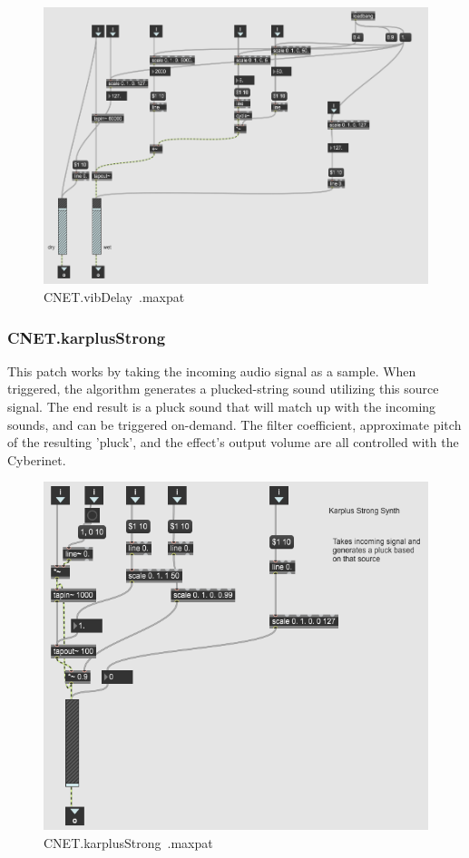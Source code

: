 \begin{figure}
    \centering
    \includegraphics[scale=0.8]{diagrams/maxPatches/CNET.vibDelay~.png}
    \caption{CNET.vibDelay~.maxpat}
    \label{fig:vibDel}
\end{figure}

\subsubsection{CNET.karplusStrong~}
This patch works by taking the incoming audio signal as a sample. When triggered, the algorithm generates a plucked-string sound utilizing this source signal. The end result is a pluck sound that will match up with the incoming sounds, and can be triggered on-demand. The filter coefficient, approximate pitch of the resulting 'pluck', and the effect's output volume are all controlled with the Cyberinet.

\begin{figure}
    \centering
    \includegraphics{diagrams/maxPatches/CNET.kStrong.png}
    \caption{CNET.karplusStrong~.maxpat}
    \label{fig:kstrong}
\end{figure}

